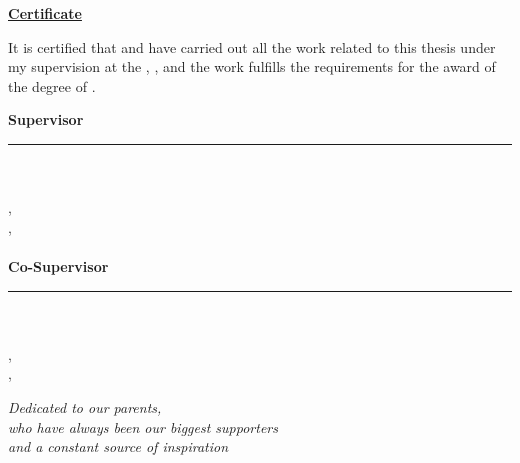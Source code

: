 \begin{center}{\Large\bfseries \underline{Certificate}}\end{center}
\vspace{0.3cm}
It is certified that \studentA{} and \studentB{} have carried out all the work related to this thesis under my supervision at the \department, \university, and the work fulfills the requirements for the award of the degree of \degree.
\vspace{2.5cm}
\begin{flushright}
\textbf{Supervisor}\\[1.6cm]
\rule{4cm}{0.4pt}\\
\supervisor\\
\designation,\\
\department,\\
\universityshort\\[1.6cm]
\textbf{Co-Supervisor}\\[1.6cm]
\rule{4cm}{0.4pt}\\
\cosupervisor\\
\designation,\\
\department,\\
\universityshort
\end{flushright}
\clearpage

\vspace*{0.4\textheight}
\begin{center}
{\large\itshape Dedicated to our parents,\\[0.4cm]
who have always been our biggest supporters\\[0.4cm]
and a constant source of inspiration\par}
\end{center}
\clearpage

